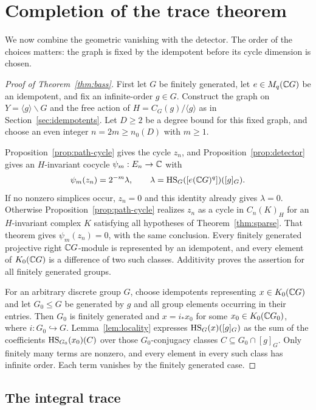 \section{Completion of the trace theorem}
\label{sec:completion}

We now combine the geometric vanishing with the detector. The order of
the choices matters: the graph is fixed by the idempotent before its
cycle dimension is chosen.

\begin{proof}[Proof of Theorem~\ref{thm:bass}]
First let $G$ be finitely generated, let $e\in M_q(\mathbb C G)$ be an
idempotent, and fix an infinite-order $g\in G$. Construct the graph on
$Y=\langle g\rangle\backslash G$ and the free action of
$H=C_G(g)/\langle g\rangle$ as in Section~\ref{sec:idempotents}.
Let $D\geq2$ be a degree bound for this fixed graph, and choose an even
integer $n=2m\geq n_0(D)$ with $m\geq1$.

Proposition~\ref{prop:path-cycle} gives the cycle $z_n$, and
Proposition~\ref{prop:detector} gives an $H$-invariant cocycle
$\psi_m:E_n\to\mathbb C$ with
\[
 \psi_m(z_n)=2^{-m}\lambda,
 \qquad
 \lambda=\operatorname{HS}_G([e(\mathbb C G)^q])([g]_G).
\]
If no nonzero simplices occur, $z_n=0$ and this identity already gives
$\lambda=0$. Otherwise Proposition~\ref{prop:path-cycle} realizes $z_n$
as a cycle in $C_n(K)_H$ for an $H$-invariant complex $K$ satisfying all
hypotheses of Theorem~\ref{thm:sparse}. That theorem gives
$\psi_m(z_n)=0$, with the same conclusion. Every finitely generated
projective right $\mathbb C G$-module is represented by an idempotent, and every element of
$K_0(\mathbb C G)$ is a difference of two such classes. Additivity proves the
assertion for all finitely generated groups.

For an arbitrary discrete group $G$, choose idempotents representing
$x\in K_0(\mathbb C G)$ and let $G_0\leq G$ be generated by $g$ and all group
elements occurring in their entries. Then $G_0$ is finitely generated
and $x=i_*x_0$ for some $x_0\in K_0(\mathbb C G_0)$, where $i:G_0\hookrightarrow G$.
Lemma~\ref{lem:locality} expresses $\operatorname{HS}_G(x)([g]_G)$ as the sum of the
coefficients $\operatorname{HS}_{G_0}(x_0)(C)$ over those $G_0$-conjugacy classes
$C\subseteq G_0\cap[g]_G$. Only finitely many terms are nonzero, and
every element in every such class has infinite order. Each term
vanishes by the finitely generated case.
\end{proof}

\subsection{The integral trace}

